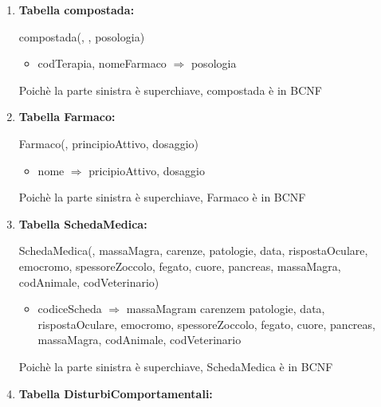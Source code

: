 \documentclass[12pt,a4paper]{article}
\begin{document}
\begin{enumerate}
\item[] \textbf{Tabella compostada:}

compostada(\underline{}, \underline{}, posologia)
\begin{itemize}
\vspace{-5pt}
\item codTerapia, nomeFarmaco $\Rightarrow$ posologia
\vspace{-5pt}
\end{itemize}
Poichè la parte sinistra è superchiave, compostada è in BCNF
\vspace{10pt}



\item[] \textbf{Tabella Farmaco:}

Farmaco(\underline{}, principioAttivo, dosaggio)
\begin{itemize}
\vspace{-5pt}
\item nome $\Rightarrow$ pricipioAttivo, dosaggio
\vspace{-5pt}
\end{itemize}
Poichè la parte sinistra è superchiave, Farmaco è in BCNF
\vspace{10pt}



\item[] \textbf{Tabella SchedaMedica:}

SchedaMedica(\underline{}, massaMagra, carenze, patologie, data, rispostaOculare, emocromo, spessoreZoccolo, fegato, cuore, pancreas, massaMagra,  codAnimale,  codVeterinario)
\begin{itemize}
\vspace{-5pt}
\item codiceScheda $\Rightarrow$ massaMagram carenzem patologie, data, rispostaOculare, emocromo, spessoreZoccolo, fegato, cuore, pancreas, massaMagra, codAnimale, codVeterinario
\vspace{-5pt}
\end{itemize}
Poichè la parte sinistra è superchiave, SchedaMedica è in BCNF
\vspace{10pt}



\item[] \textbf{Tabella DisturbiComportamentali:}


\end{enumerate}
\end{document}
